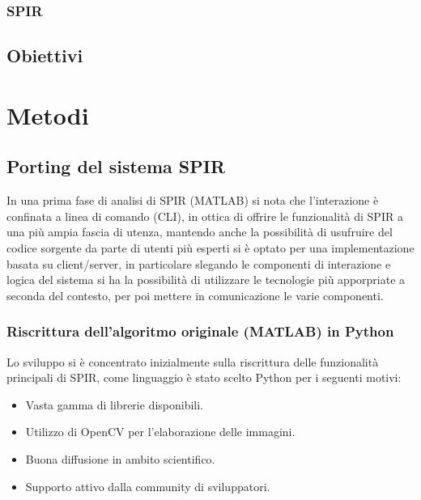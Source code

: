 \documentclass[a4paper,12pt]{report}
\begin{document}
    \subsection{SPIR}
  \section{Obiettivi}

\chapter{Metodi}
  \section{Porting del sistema SPIR}
    In una prima fase di analisi di SPIR (MATLAB) si nota che l'interazione è confinata
    a linea di comando (CLI), in ottica di offrire le funzionalità di SPIR a una più ampia
    fascia di utenza, mantendo anche la possibilità di usufruire del codice sorgente 
    da parte di utenti più esperti si è optato per una implementazione basata su client/server,
    in particolare slegando le componenti di interazione e logica del sistema si ha la possibilità
    di utilizzare le tecnologie più apporpriate a seconda del contesto, per poi mettere in comunicazione le 
    varie componenti.
    \subsection{Riscrittura dell'algoritmo originale (MATLAB) in Python}
      Lo sviluppo si è concentrato inizialmente sulla riscrittura delle funzionalità principali di SPIR,
      come linguaggio è stato scelto Python per i seguenti motivi:
      \begin{itemize}
        \item Vasta gamma di librerie disponibili.
        \item Utilizzo di OpenCV per l'elaborazione delle immagini.
        \item Buona diffusione in ambito scientifico.
        \item Supporto attivo dalla community di sviluppatori.
      \end{itemize}
\end{document}
